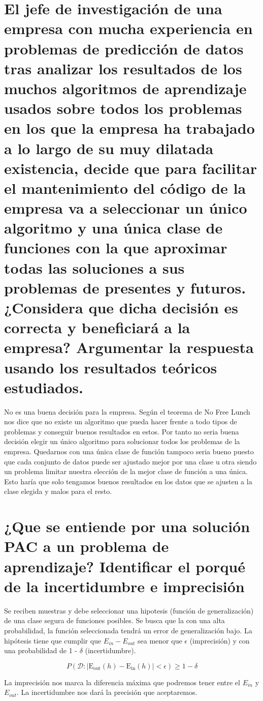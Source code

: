 \documentclass[titlepage]{article}
\begin{document}
	
	\section{El jefe de investigación de una empresa con mucha experiencia en problemas de predicción de datos tras analizar los resultados de los muchos algoritmos de aprendizaje usados sobre todos los problemas en los que la empresa ha trabajado a lo largo de su muy dilatada existencia, decide que para facilitar el mantenimiento del código de la empresa va a seleccionar un único algoritmo y una única clase de funciones con la que  aproximar todas las soluciones a sus problemas de presentes y futuros. ¿Considera que dicha decisión es correcta y beneficiará a la empresa? Argumentar la respuesta usando los resultados teóricos estudiados.}
	
	No es una buena decisión para la empresa. 
	Según el teorema de No Free Lunch nos dice que no existe un algoritmo que pueda hacer frente a todo tipos de problemas y conseguir buenos resultados en estos. Por tanto no seria buena decisión elegir un único algoritmo para solucionar todos los problemas de la empresa. 
	Quedarnos con una única clase de función tampoco seria bueno puesto que cada conjunto de datos puede ser ajustado mejor por una clase u otra siendo un problema limitar nuestra elección de la mejor clase de función a una única. Esto haría que solo tengamos buenos resultados en los datos que se ajusten a la clase elegida y malos para el resto. 
	
	\section{¿Que se entiende por una solución PAC a un problema de aprendizaje? Identificar el porqué de la incertidumbre e imprecisión}
	Se reciben muestras y debe seleccionar una hipotesis (función de generalización) de una clase segura de funciones posibles. Se busca que la con una alta probabilidad, la función seleccionada tendrá un error de generalización bajo. La hipótesis tiene que cumplir que $E_{in}-E_{out}$ sea menor que $\epsilon$ (imprecisión) y con una probabilidad de 1 - $\delta$ (incertidumbre).
	
	$$
	P\left(\mathcal{D} : | \mathrm{E}_{\text {out}}(h)-\mathrm{E}_{\text {in}}(h) |<\epsilon\right) \geq 1-\delta
	$$
	
	La imprecisión nos marca la diferencia máxima que podremos tener entre el $E_{in}$ y $E_{out}$. La incertidumbre nos dará la precisión que aceptaremos.
	
\end{document}
